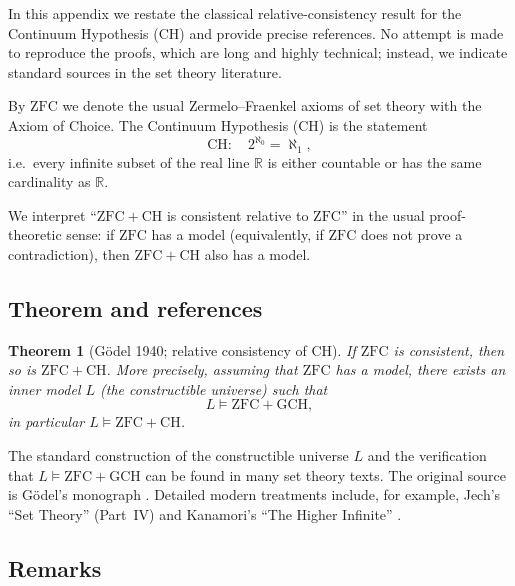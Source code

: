 \documentclass[11pt]{book}
\theoremstyle{plain}
\newtheorem{theorem}{Theorem}[chapter]      \newtheorem{proposition}[theorem]{Proposition} \newtheorem{lemma}[theorem]{Lemma}          \newtheorem{corollary}[theorem]{Corollary}
\theoremstyle{definition}
\begin{document}
In this appendix we restate the classical relative-consistency result
for the Continuum Hypothesis (CH) and provide precise references.  No
attempt is made to reproduce the proofs, which are long and highly
technical; instead, we indicate standard sources in the set theory
literature.

By \(\mathrm{ZFC}\) we denote the usual Zermelo–Fraenkel axioms of set
theory with the Axiom of Choice.  The Continuum Hypothesis (CH) is the
statement
\[
  \mathrm{CH}:\quad
  2^{\aleph_0} = \aleph_1,
\]
i.e.\ every infinite subset of the real line \(\mathbb{R}\) is either
countable or has the same cardinality as \(\mathbb{R}\).

We interpret “\(\mathrm{ZFC}+\mathrm{CH}\) is consistent relative to
\(\mathrm{ZFC}\)” in the usual proof-theoretic sense: if
\(\mathrm{ZFC}\) has a model (equivalently, if \(\mathrm{ZFC}\) does
not prove a contradiction), then \(\mathrm{ZFC}+\mathrm{CH}\) also has
a model.



\subsection*{Theorem and references}


\begin{theorem}[Gödel 1940; relative consistency of CH]
\label{thm:III-T2-Godel}
If \(\mathrm{ZFC}\) is consistent, then so is
\(\mathrm{ZFC} + \mathrm{CH}\).  More precisely, assuming that
\(\mathrm{ZFC}\) has a model, there exists an inner model
\(L\) (the constructible universe) such that
\[
  L \models \mathrm{ZFC} + \mathrm{GCH},
\]
in particular \(L\models \mathrm{ZFC} + \mathrm{CH}\).
\end{theorem}

The standard construction of the constructible universe \(L\) and the
verification that \(L\models\mathrm{ZFC}+\mathrm{GCH}\) can be found
in many set theory texts.  The original source is Gödel’s monograph
\cite{Godel1940}.  Detailed modern treatments include, for example,
Jech’s “Set Theory” \cite{Jech2003} (Part~IV) and Kanamori’s
“The Higher Infinite” \cite{Kanamori2003}.



\subsection*{Remarks}
\end{document}
